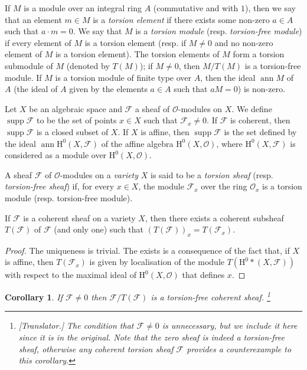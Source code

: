 \documentclass{article}
\theoremstyle{plain}
\newenvironment{proposition}[1]
    {\renewcommand\theinnercustomproposition{#1}\innercustomproposition}
    {\endinnercustomproposition}
\newtheorem*{cor}{Corollary}
\theoremstyle{definition}
\newcommand{\sh}{\mathscr}
\newcommand{\HH}{\mathrm{H}}
\DeclareMathOperator{\ann}{ann}
\DeclareMathOperator{\supp}{supp}
\newcommand{\oldpage}[1]{\marginpar{\footnotesize$\Big\vert$ \textit{p.~#1}}}
\begin{document}
If $M$ is a module over an integral ring $A$ (commutative and with $1$), then we say that an element $m\in M$ is a \emph{torsion element} if there exists some non-zero $a\in A$ such that $a\cdot m=0$.
We say that $M$ is a \emph{torsion module} (resp. \emph{torsion-free module}) if every element of $M$ is a torsion element (resp. if $M\neq0$ and no non-zero element of $M$ is a torsion element).
The torsion elements of $M$ form a torsion submodule of $M$ (denoted by $T(M)$);
if $M\neq0$, then $M/T(M)$ is a torsion-free module.
If $M$ is a torsion module of finite type over $A$, then the ideal $\ann M$ of $A$ (the ideal of $A$ given by the elements $a\in A$ such that $aM=0$) is non-zero.

Let $X$ be an algebraic space and $\sh{F}$ a sheaf of $\sh{O}$-modules on $X$.
We define $\supp\sh{F}$ to be the set of points $x\in X$ such that $\sh{F}_x\neq0$.
If $\sh{F}$ is coherent, then $\supp\sh{F}$ is a closed subset of $X$.
If $X$ is affine, then $\supp\sh{F}$ is the set defined by the ideal $\ann\HH^0(X,\sh{F})$ of the affine algebra $\HH^0(X,\sh{O})$, where $\HH^0(X,\sh{F})$ is considered as a module over $\HH^0(X,\sh{O})$.

A sheaf $\sh{F}$ of $\sh{O}$-modules on a \emph{variety} $X$ is said to be a \emph{torsion sheaf} (resp. \emph{torsion-free sheaf}) if, for every $x\in X$, the module $\sh{F}_x$ over the ring $\sh{O}_x$ is a torsion module (resp. torsion-free module).

\oldpage{4-02}
\begin{proposition}{1}
\label{proposition1}
  If $\sh{F}$ is a coherent sheaf on a variety $X$, then there exists a coherent subsheaf $T(\sh{F})$ of $\sh{F}$ (and only one) such that $(T(\sh{F}))_x = T(\sh{F}_x)$.
\end{proposition}

\begin{proof}
  The uniqueness is trivial.
  The exists is a consequence of the fact that, if $X$ is affine, then $T(\sh{F}_x)$ is given by localisation of the module $T(\HH^0*(X,\sh{F}))$ with respect to the maximal ideal of $\HH^0(X,\sh{O})$ that defines $x$.
\end{proof}

\begin{cor}
  \renewcommand*{\thefootnote}{\fnsymbol{footnote}}
  If $\sh{F}\neq0$ then $\sh{F}/T(\sh{F})$ is a torsion-free coherent sheaf.
  \footnote{\emph{[Translator.] The condition that $\sh{F}\neq0$ is unnecessary, but we include it here since it is in the original. Note that the zero sheaf is indeed a torsion-free sheaf, otherwise any coherent torsion sheaf $\sh{F}$ provides a counterexample to this corollary.}}
\end{cor}
\end{document}
